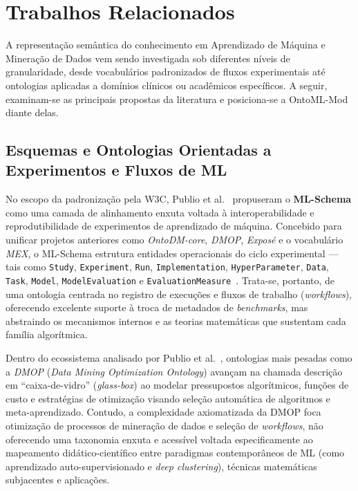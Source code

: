 \documentclass[11pt,a4paper]{article}
\newcommand{\onto}[1]{\texttt{#1}}
\begin{document}
\section{Trabalhos Relacionados}\label{sec:rel}

A representação semântica do conhecimento em Aprendizado de Máquina e Mineração de Dados vem sendo investigada sob diferentes níveis de granularidade, desde vocabulários padronizados de fluxos experimentais até ontologias aplicadas a domínios clínicos ou acadêmicos específicos. A seguir, examinam-se as principais propostas da literatura e posiciona-se a OntoML-Mod diante delas.

\subsection{Esquemas e Ontologias Orientadas a Experimentos e Fluxos de ML}

No escopo da padronização pela W3C, Publio et al.~\cite{publio2018mlschema} propuseram o \textbf{ML-Schema} como uma camada de alinhamento enxuta voltada à interoperabilidade e reprodutibilidade de experimentos de aprendizado de máquina. Concebido para unificar projetos anteriores como \emph{OntoDM-core}, \emph{DMOP}, \emph{Exposé} e o vocabulário \emph{MEX}, o ML-Schema estrutura entidades operacionais do ciclo experimental --- tais como \onto{Study}, \onto{Experiment}, \onto{Run}, \onto{Implementation}, \onto{HyperParameter}, \onto{Data}, \onto{Task}, \onto{Model}, \onto{ModelEvaluation} e \onto{EvaluationMeasure}~\cite{publio2018mlschema}. Trata-se, portanto, de uma ontologia centrada no registro de execuções e fluxos de trabalho (\emph{workflows}), oferecendo excelente suporte à troca de metadados de \emph{benchmarks}, mas abstraindo os mecanismos internos e as teorias matemáticas que sustentam cada família algorítmica.

Dentro do ecossistema analisado por Publio et al.~\cite{publio2018mlschema}, ontologias mais pesadas como a \emph{DMOP} (\emph{Data Mining Optimization Ontology}) avançam na chamada descrição em ``caixa-de-vidro'' (\emph{glass-box}) ao modelar pressupostos algorítmicos, funções de custo e estratégias de otimização visando seleção automática de algoritmos e meta-aprendizado. Contudo, a complexidade axiomatizada da DMOP foca otimização de processos de mineração de dados e seleção de \emph{workflows}, não oferecendo uma taxonomia enxuta e acessível voltada especificamente ao mapeamento didático-científico entre paradigmas contemporâneos de ML (como aprendizado auto-supervisionado e \emph{deep clustering}), técnicas matemáticas subjacentes e aplicações.
\end{document}
